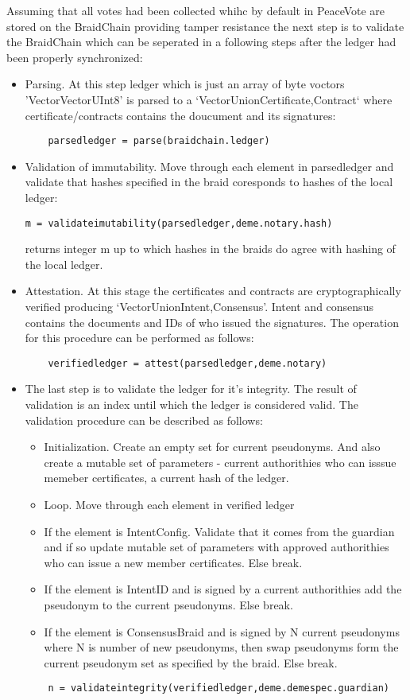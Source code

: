 \documentclass{article}
\begin{document}
Assuming that all votes had been collected whihc by default in PeaceVote are stored on the BraidChain providing tamper resistance the next step is to validate the BraidChain which can be seperated in a following steps after the ledger had been properly synchronized:
\begin{itemize}
\item Parsing. At this step ledger which is just an array of byte voctors 'Vector{Vector{UInt8}}' is parsed to a `Vector{Union{Certificate,Contract}}` where certificate/contracts contains the doucument and its signatures:
\begin{lstlisting}
    parsedledger = parse(braidchain.ledger)
\end{lstlisting}
\item Validation of immutability. Move through each element in parsedledger and validate that hashes specified in the braid coresponds to hashes of the local ledger:
\begin{lstlisting}
m = validateimutability(parsedledger,deme.notary.hash)
\end{lstlisting}
returns integer m up to which hashes in the braids do agree with hashing of the local ledger.
\item Attestation. At this stage the certificates and contracts are cryptographically verified producing `Vector{Union{Intent,Consensus}}'. Intent and consensus contains the documents and IDs of who issued the signatures. The operation for this procedure can be performed as follows:
\begin{lstlisting}
    verifiedledger = attest(parsedledger,deme.notary)
\end{lstlisting}
\item The last step is to validate the ledger for it's integrity. The result of validation is an index until which the ledger is considered valid. The validation procedure can be described as follows:
  \begin{itemize}
  \item Initialization. Create an empty set for current pseudonyms. And also create a mutable set of parameters - current authorithies who can isssue memeber certificates, a current hash of the ledger. 
  \item Loop. Move through each element in verified ledger
  \item If the element is Intent{Config}. Validate that it comes from the guardian and if so update mutable set of parameters with approved authorithies who can issue a new member certificates. Else break.
  \item If the element is Intent{ID} and is signed by a current authorithies add the pseudonym to the current pseudonyms. Else break.
  \item If the element is Consensus{Braid} and is signed by N current pseudonyms where N is number of new pseudonyms, then swap pseudonyms form the current pseudonym set as specified by the braid. Else break.
  \end{itemize}
\begin{lstlisting}
    n = validateintegrity(verifiedledger,deme.demespec.guardian)
\end{lstlisting}
\end{itemize}
\end{document}
